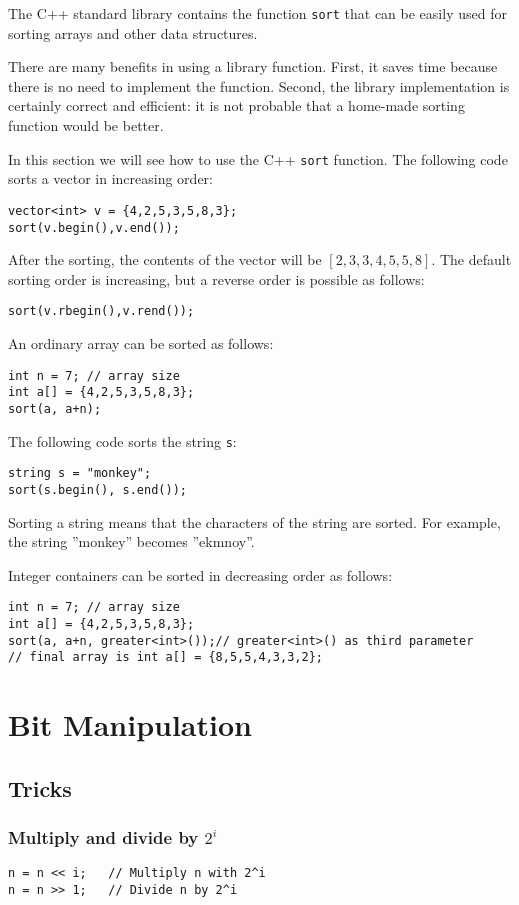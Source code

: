 \documentclass[twoside,12pt,a4paper,english]{book}
\theoremstyle{definition}
\theoremstyle{problemstyle}
\begin{document}
The C++ standard library contains
the function \texttt{sort} that can be easily used for
sorting arrays and other data structures.

There are many benefits in using a library function.
First, it saves time because there is no need to
implement the function.
Second, the library implementation is
certainly correct and efficient: it is not probable
that a home-made sorting function would be better.

In this section we will see how to use the
C++ \texttt{sort} function.
The following code sorts
a vector in increasing order:
\begin{lstlisting}
vector<int> v = {4,2,5,3,5,8,3};
sort(v.begin(),v.end());
\end{lstlisting}
After the sorting, the contents of the
vector will be
$[2,3,3,4,5,5,8]$.
The default sorting order is increasing,
but a reverse order is possible as follows:
\begin{lstlisting}
sort(v.rbegin(),v.rend());
\end{lstlisting}
An ordinary array can be sorted as follows:
\begin{lstlisting}
int n = 7; // array size
int a[] = {4,2,5,3,5,8,3};
sort(a, a+n);
\end{lstlisting}
The following code sorts the string \texttt{s}:
\begin{lstlisting}
string s = "monkey";
sort(s.begin(), s.end());
\end{lstlisting}
Sorting a string means that the characters
of the string are sorted.
For example, the string ''monkey'' becomes ''ekmnoy''.

Integer containers can be sorted in decreasing order as follows:

\begin{lstlisting}
int n = 7; // array size
int a[] = {4,2,5,3,5,8,3};
sort(a, a+n, greater<int>());// greater<int>() as third parameter
// final array is int a[] = {8,5,5,4,3,3,2};
\end{lstlisting}


\chapter{Bit Manipulation}
\section{Tricks}
\subsection{Multiply and divide by $2^i$}
\begin{lstlisting}
n = n << i;   // Multiply n with 2^i
n = n >> 1;   // Divide n by 2^i
\end{lstlisting}
\end{document}
